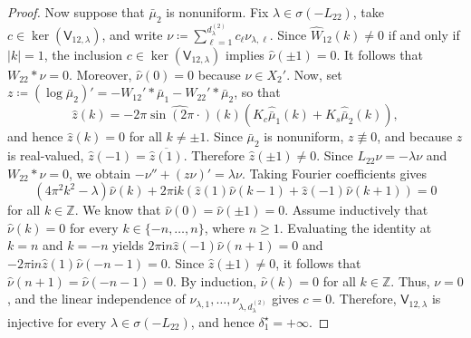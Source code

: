\documentclass[10pt,a4paper]{amsart}
\begin{document}
\begin{proof}
    Now suppose that $\bar\mu_2$ is nonuniform.
    Fix $\lambda \in \sigma(-L_{22})$, take $c \in \ker(\mathsf{V}_{12,\lambda})$, and write $\nu \coloneqq \sum_{\ell=1}^{d_\lambda^{(2)}} c_\ell \nu_{\lambda,\ell}$.
    Since $\widehat{W}_{12}(k) \neq 0$ if and only if $|k| = 1$, the inclusion $c \in \ker(\mathsf{V}_{12,\lambda})$ implies $\widehat\nu(\pm 1) = 0$.
    It follows that $W_{22} \ast \nu = 0$.
    Moreover, $\widehat\nu(0) = 0$ because $\nu \in X_2'$.
    Now, set $z \coloneqq (\log\bar\mu_2)' = -W_{12}' \ast \bar\mu_1 - W_{22}' \ast \bar\mu_2$, so that
    \[
    \widehat{z}(k) = -2\pi \widehat{\sin(2\pi \cdot)}(k) \left(K_c \widehat{\bar\mu}_1(k) + K_s \widehat{\bar\mu}_2(k)\right),
    \]
    and hence $\widehat{z}(k) = 0$ for all $k \neq \pm 1$.
    Since $\bar\mu_2$ is nonuniform, $z \not \equiv 0$, and because $z$ is real-valued, $\widehat{z}(-1) = \overline{\widehat{z}(1)}$. 
    Therefore $\widehat{z}(\pm 1) \neq 0$.
    Since $L_{22}\nu = -\lambda\nu$ and $W_{22} \ast \nu = 0$, we obtain $-\nu'' + (z\nu)' = \lambda\nu$.
    Taking Fourier coefficients gives
    \[
    (4\pi^2 k^2 - \lambda) \widehat\nu(k) + 2\pi\mathrm{i} k (\widehat{z}(1) \widehat\nu(k-1) + \widehat{z}(-1) \widehat\nu(k+1)) = 0
    \]
    for all $k \in \mathbb{Z}$.
    We know that $\widehat\nu(0) = \widehat\nu(\pm 1) = 0$.
    Assume inductively that $\widehat\nu(k) = 0$ for every $k \in \{-n, \ldots, n\}$, where $n \ge 1$.
    Evaluating the identity at $k = n$ and $k = -n$ yields $2\pi \mathrm{i} n \widehat{z}(-1) \widehat\nu(n+1) = 0$ and $-2\pi \mathrm{i} n \widehat{z}(1) \widehat\nu(-n-1) = 0$. 
    Since $\widehat{z}(\pm 1) \neq 0$, it follows that $\widehat\nu(n+1) = \widehat\nu(-n-1) = 0$.
    By induction, $\widehat\nu(k) = 0$ for all $k \in \mathbb{Z}$.
    Thus, $\nu = 0$, and the linear independence of $\nu_{\lambda, 1}, \ldots, \nu_{\lambda, d_\lambda^{(2)}}$ gives $c = 0$. 
    Therefore, $\mathsf{V}_{12,\lambda}$ is injective for every $\lambda \in \sigma(-L_{22})$, and hence $\delta_1^\star = +\infty$.
\end{proof}
\end{document}
